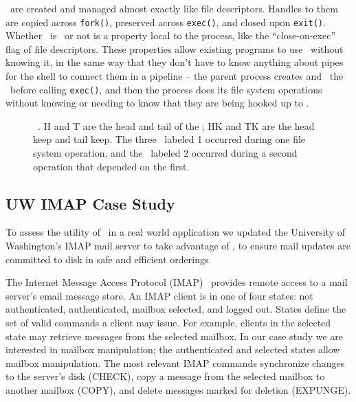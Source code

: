\Opgroups\ are created and managed almost exactly like file descriptors. Handles
to them are copied across \texttt{fork()}, preserved across \texttt{exec()}, and
closed upon \texttt{exit()}. Whether \anopgroup\ is \engaged\ or not is a
property local to the process, like the ``close-on-exec'' flag of file
descriptors. These properties allow existing programs to use \opgroups\ without
knowing it, in the same way that they don't have to know anything about pipes
for the shell to connect them in a pipeline -- the parent process creates and
\engages\ the \opgroups\ before calling \texttt{exec()}, and then the process
does its file system operations without knowing or needing to know that they are
being hooked up to \anopgroup.

\begin{figure}[htb]
\caption{\label{fig:opgroup-chdescs} \Opgroup\ \chdescs. H and T are the head
and tail of the \opgroup; HK and TK are the head keep and tail keep. The three
\chdescs\ labeled 1 occurred during one file system operation, and the \chdesc\
labeled 2 occurred during a second operation that depended on the first.}
\end{figure}

\subsection{UW IMAP Case Study}
\label{sec:opgroup:uwimap}

To assess the utility of \opgroups\ in a real world application we
updated the University of Washington's IMAP mail server to take
advantage of \opgroups, to ensure mail updates are committed to disk
in safe and efficient orderings.

The Internet Message Access Protocol (IMAP)~\cite{rfc3501} provides
remote access to a mail server's email message store. An IMAP client
is in one of four states: not authenticated, authenticated, mailbox
selected, and logged out. States define the set of valid commands a
client may issue. For example, clients in the selected state may
retrieve messages from the selected mailbox. In our case study we are
interested in mailbox manipulation; the authenticated and selected
states allow mailbox manipulation. The most relevant IMAP commands
synchronize changes to the server's disk (CHECK), copy a message from
the selected mailbox to another mailbox (COPY), and delete messages
marked for deletion (EXPUNGE).

